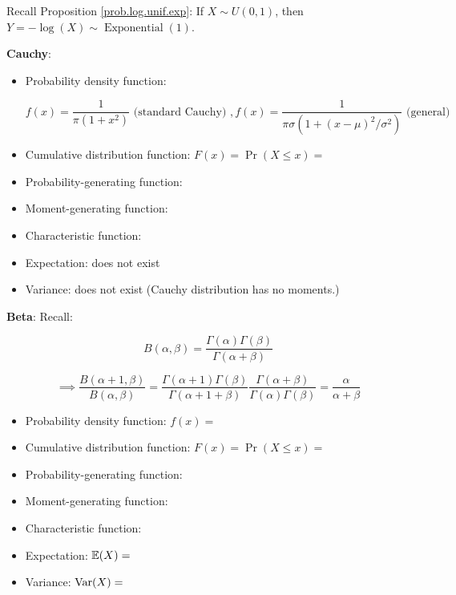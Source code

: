 \begin{remark}
Recall Proposition \ref{prob.log.unif.exp}: If \(X \sim U(0, 1)\), then \(Y = - \log(X) \sim \operatorname{Exponential}(1)\). 
\end{remark}

\textbf{Cauchy}: 

\begin{itemize}

\item Probability density function: 

\[
f(x) = \frac{1}{\pi(1 + x^2)} \text{ (standard Cauchy) }, f(x) = \frac{1}{\pi \sigma (1 + (x - \mu)^2/\sigma^2)}  \text{ (general)}
\]

\item Cumulative distribution function: \(F(x) = \Pr(X \leq x) = \)

\item Probability-generating function:

\item Moment-generating function:

\item Characteristic function:

\item Expectation: does not exist

\item Variance: does not exist (Cauchy distribution has no moments.)

\end{itemize}

\textbf{Beta}: Recall:

\[
B(\alpha, \beta) = \frac{\Gamma(\alpha) \Gamma(\beta)}{\Gamma(\alpha + \beta)}
\]

\[
\implies \frac{B(\alpha + 1, \beta)}{B(\alpha, \beta)} = \frac{\Gamma(\alpha + 1) \Gamma(\beta)}{\Gamma(\alpha + 1 + \beta)} \frac{\Gamma(\alpha + \beta)}{\Gamma(\alpha)\Gamma(\beta)} = \frac{\alpha}{\alpha + \beta}
\]

\begin{itemize}

\item Probability density function: \(f(x) = \)

\item Cumulative distribution function: \(F(x) = \Pr(X \leq x) = \)

\item Probability-generating function:

\item Moment-generating function:

\item Characteristic function:

\item Expectation: \(\E(X) = \)

\item Variance: \(\Var(X) = \)

\end{itemize}

